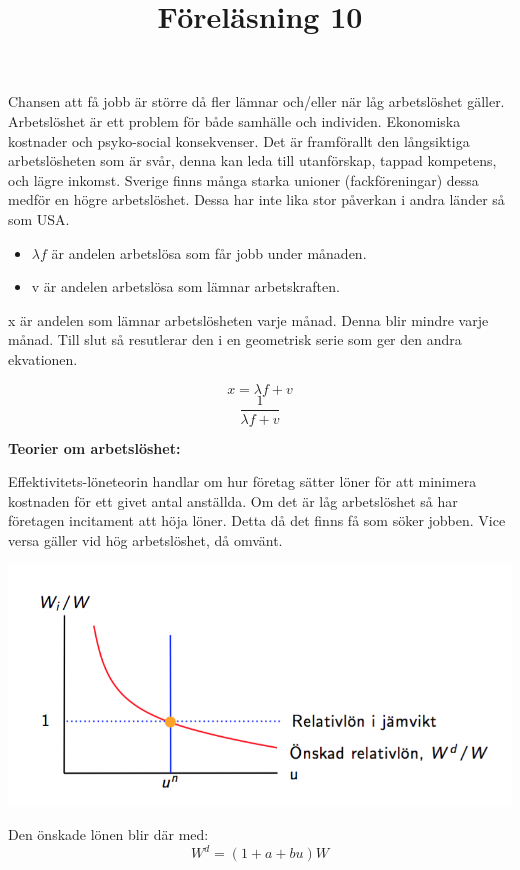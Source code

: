 \documentclass{article}
\begin{document}
Chansen att få jobb är större då fler lämnar och/eller när låg arbetslöshet gäller. Arbetslöshet är ett problem för både samhälle och individen. Ekonomiska kostnader och psyko-social konsekvenser. Det är framförallt den långsiktiga arbetslösheten som är svår, denna kan leda till utanförskap, tappad kompetens, och lägre inkomst. Sverige finns många starka unioner (fackföreningar) dessa medför en högre arbetslöshet. Dessa har inte lika stor påverkan i andra länder så som USA. 

\begin{itemize}
    \item $\lambda f $ är andelen arbetslösa som får jobb under månaden.
    \item v är andelen arbetslösa som lämnar arbetskraften. 
\end{itemize}

x är andelen som lämnar arbetslösheten varje månad. Denna blir mindre varje månad. Till slut så resutlerar den i en geometrisk serie som ger den andra ekvationen.  

$$
 x = \lambda f + v 
$$
$$
\frac{1}{\lambda f + v}
$$

\vspace{5mm}
\title{Föreläsning 10}
\vspace{5mm} \par \noindent 

\textbf{Teorier om arbetslöshet:}
\vspace{5mm} \par \noindent Effektivitets-löneteorin handlar om hur företag sätter löner för att minimera kostnaden för ett givet antal anställda. Om det är låg arbetslöshet så har företagen incitament att höja löner. Detta då det finns få som söker jobben. Vice versa gäller vid hög arbetslöshet, då omvänt. 

\includegraphics[scale=0.6]{skarm4}

Den önskade lönen blir där med: 
$$
W^d = (1+a+bu)W
$$






\end{document}
